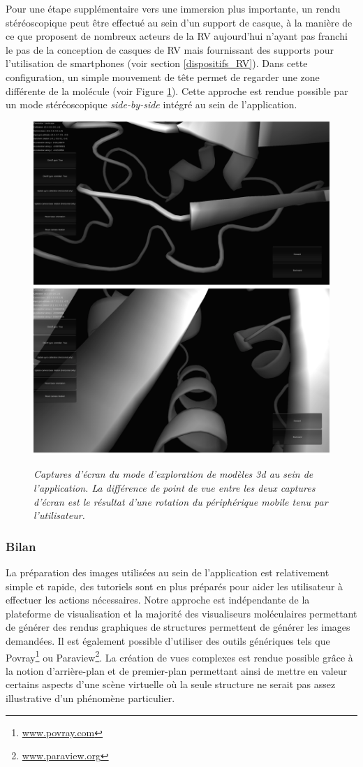 Pour une étape supplémentaire vers une immersion plus importante, un rendu stéréoscopique peut être effectué au sein d'un support de casque, à la manière de ce que proposent de nombreux acteurs de la RV aujourd'hui n'ayant pas franchi le pas de la conception de casques de RV mais fournissant des supports pour l'utilisation de smartphones (voir section \ref{dispositifs_RV}). Dans cette configuration, un simple mouvement de tête permet de regarder une zone différente de la molécule (voir Figure \ref{Fig:molexplorer_screenshot}). Cette approche est rendue possible par un mode stéréoscopique \textit{side-by-side} intégré au sein de l'application. 

\begin{figure}[h]
  \centering
  {\includegraphics[width=.75\linewidth]{./figures/ch3/molexplorer_screenshot.png}}
    \caption{{\it Captures d'écran du mode d'exploration de modèles 3d au sein de l'application. La différence de point de vue entre les deux captures d'écran est le résultat d'une rotation du périphérique mobile tenu par l'utilisateur.}}
  \label{Fig:molexplorer_screenshot}
  \hspace{0.2cm}
\end{figure}

\subsubsection{Bilan}

La préparation des images utilisées au sein de l'application est relativement simple et rapide, des tutoriels sont en plus préparés pour aider les utilisateur à effectuer les actions nécessaires. Notre approche est indépendante de la plateforme de visualisation et la majorité des visualiseurs moléculaires permettant de générer des rendus graphiques de structures permettent de générer les images demandées. Il est également possible d'utiliser des outils génériques tels que Povray\footnote{\url{www.povray.com}} ou Paraview\footnote{\url{www.paraview.org}}. La création de vues complexes est rendue possible grâce à la notion d'arrière-plan et de premier-plan permettant ainsi de mettre en valeur certains aspects d'une scène virtuelle où la seule structure ne serait pas assez illustrative d'un phénomène particulier.

